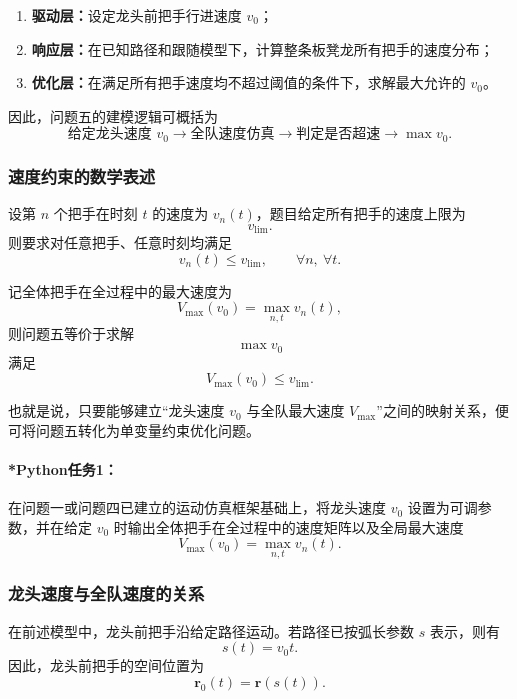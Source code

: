 \documentclass[12pt,a4paper]{ctexart}
\begin{document}
\begin{enumerate}
    \item \textbf{驱动层：}设定龙头前把手行进速度 $v_0$；
    \item \textbf{响应层：}在已知路径和跟随模型下，计算整条板凳龙所有把手的速度分布；
    \item \textbf{优化层：}在满足所有把手速度均不超过阈值的条件下，求解最大允许的 $v_0$。
\end{enumerate}

因此，问题五的建模逻辑可概括为
\[
\text{给定龙头速度 } v_0 \longrightarrow \text{全队速度仿真} \longrightarrow \text{判定是否超速} \longrightarrow \max v_0.
\]

\subsubsection{速度约束的数学表述}
设第 $n$ 个把手在时刻 $t$ 的速度为 $v_n(t)$，题目给定所有把手的速度上限为
\begin{equation}
v_{\mathrm{lim}}.
\end{equation}
则要求对任意把手、任意时刻均满足
\begin{equation}
v_n(t)\le v_{\mathrm{lim}}, \qquad \forall n,\ \forall t.
\end{equation}

记全体把手在全过程中的最大速度为
\begin{equation}
V_{\max}(v_0)=\max_{n,t} v_n(t),
\end{equation}
则问题五等价于求解
\begin{equation}
\max v_0
\end{equation}
满足
\begin{equation}
V_{\max}(v_0)\le v_{\mathrm{lim}}.
\end{equation}

也就是说，只要能够建立“龙头速度 $v_0$ 与全队最大速度 $V_{\max}$”之间的映射关系，便可将问题五转化为单变量约束优化问题。

\paragraph{*Python任务1：}
在问题一或问题四已建立的运动仿真框架基础上，将龙头速度 $v_0$ 设置为可调参数，并在给定 $v_0$ 时输出全体把手在全过程中的速度矩阵以及全局最大速度
\[
V_{\max}(v_0)=\max_{n,t} v_n(t).
\]

\subsubsection{龙头速度与全队速度的关系}
在前述模型中，龙头前把手沿给定路径运动。若路径已按弧长参数 $s$ 表示，则有
\begin{equation}
s(t)=v_0 t.
\end{equation}
因此，龙头前把手的空间位置为
\begin{equation}
\bm{r}_0(t)=\bm{r}(s(t)).
\end{equation}
\end{document}
